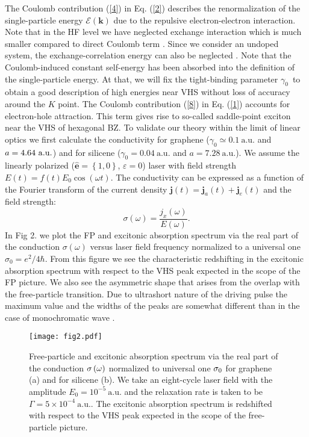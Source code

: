 \documentclass[reprint, superscriptaddress,  aps, pra]{revtex4-2}
\begin{document}
The Coulomb contribution (\ref{4}) in Eq. (\ref{2}) describes the
renormalization of the single-particle energy $\mathcal{E}\left( \mathbf{k}%
\right) $ due to the repulsive electron-electron interaction. Note that in
the HF level we have neglected exchange interaction which is much smaller
compared to direct Coulomb term \cite{Hawrylak}. Since we consider an
undoped system, the exchange-correlation energy can also be neglected \cite%
{Polini}. Note that the Coulomb-induced constant self-energy has been
absorbed into the definition of the single-particle energy. At that, we will
fix the tight-binding parameter $\gamma _{0}$\ to obtain a good description
of high energies near VHS without loss of accuracy around the $K$ point. The
Coulomb contribution (\ref{8}) in Eq. (\ref{1}) accounts for electron-hole
attraction. This term gives rise to so-called saddle-point exciton \cite%
{Yang,Kravets,Mak,Jornada} near the VHS of hexagonal BZ. To validate our
theory within the limit of linear optics we first calculate the conductivity
for graphene ($\gamma _{0}\simeq 0.1\ \mathrm{a.u.}$ and $a=4.64\ \mathrm{%
a.u.}$) and for silicene ($\gamma _{0}=0.04\ \mathrm{a.u.}$ and $a=7.28\ 
\mathrm{a.u.}$). We assume the linearly polarized ($\hat{\mathbf{e}}=\left\{
1,0\right\} $, $\varepsilon =0$) laser with field strength $E\left( t\right)
=f\left( t\right) E_{0}\cos \left( \omega t\right) $. The conductivity can
be expressed as a function of the Fourier transform of the current density $%
\mathbf{j}\left( t\right) =\mathbf{j}_{a}\left( t\right) +\mathbf{j}%
_{e}\left( t\right) $ and the field strength:%
\begin{equation}
\sigma \left( \omega \right) =\frac{j_{x}\left( \omega \right) }{E\left(
\omega \right) }.  \label{sigma}
\end{equation}%
In Fig 2. we plot the FP and excitonic absorption spectrum via the real part
of the conduction $\sigma \left( \omega \right) $ versus laser field
frequency normalized to a universal one $\sigma _{0}=e^{2}/4\hbar $. From
this figure we see the characteristic redshifting in the excitonic
absorption spectrum with respect to the VHS peak expected in the scope of
the FP picture. We also see the asymmetric shape that arises from the
overlap with the free-particle transition. Due to ultrashort nature of the
driving pulse the maximum value and the widths of the peaks are somewhat
different than in the case of monochromatic wave \cite{Stauber}. 
\begin{figure}[tbp]
\texttt{[image: fig2.pdf]}
\caption{Free-particle and excitonic absorption spectrum via the real part
of the conduction $\protect\sigma \left( \protect\omega \right) $ normalized
to universal one $\protect\sigma _{0}$ for graphene (a) and for silicene
(b). We take an eight-cycle laser field with the amplitude $E_{0}=10^{-5}\ 
\mathrm{a.u.}$ and the relaxation rate is taken to be $\Gamma =5\times
10^{-4}\ \mathrm{a.u.}$. The excitonic absorption spectrum is redshifted
with respect to the VHS peak expected in the scope of the free-particle
picture.}
\end{figure}
\end{document}
